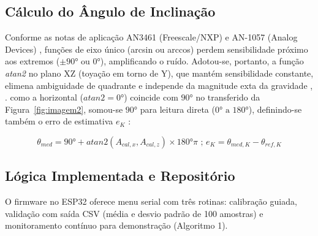 
\subsection{Cálculo do Ângulo de Inclinação}
Conforme as notas de aplicação AN3461 (Freescale/NXP) \cite{2.pedley2013} e AN-1057 (Analog Devices) \cite{3.fisher2010}, funções de eixo único (arcsin ou arccos) perdem sensibilidade próximo aos extremos ($\pm90° \text{ ou  } 0°$), amplificando o ruído. Adotou-se, portanto, a função \textit{atan2} no plano XZ (toyação em torno de Y), que mantém sensibilidade constante, elimena ambiguidade de quadrante e independe da magnitude exta da gravidade \cite{2.pedley2013}, \cite{3.fisher2010}. como a horizontal ($atan2 = 0°$) coincide com $90°$ no transferido da Figura~\ref{fig:imagem2}, somou-se $90°$ para leitura direta ($0° \text{ a } 180°$), definindo-se também o erro de estimativa $e_K$ \cite{4.ochoa2026}:

\begin{equation}
    \theta_{med} = 90° + atan2(A_{cal,x},A_{cal,z}) \times 180°\pi \text{ ; } e_K = \theta_{med,K} - \theta_{ref,K}
    \label{eq:equacao_3}
\end{equation}


\subsection{Lógica Implementada e Repositório}
O firmware no ESP32 oferece menu serial com três rotinas: calibração guiada, validação com saída CSV (média e desvio padrão de 100 amostras) e monitoramento contínuo para demonstração (Algoritmo 1).


